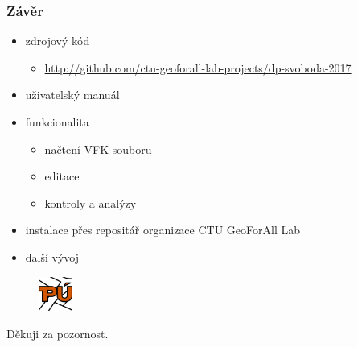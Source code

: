 \documentclass{beamer}
\begin{document}
\begin{frame}

\frametitle{Závěr}

\begin{itemize}
	\item zdrojový kód
	\begin{itemize}
		\item \url{http://github.com/ctu-geoforall-lab-projects/dp-svoboda-2017}
	\end{itemize}
	\item uživatelský manuál
	\item funkcionalita
	\begin{itemize}
		\item načtení VFK souboru
		\item editace
		\item kontroly a analýzy
	\end{itemize}
	\item instalace přes repositář organizace CTU GeoForAll Lab
	\item další vývoj
\end{itemize}

\begin{figure}[ht]
	\includegraphics[width=0.1\textwidth]{pictures/puplugin.png}
\end{figure}


\end{frame}


\begin{frame}

\Huge{\centerline{Děkuji za pozornost.}}

\end{frame}
\end{document}
